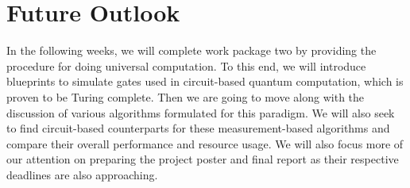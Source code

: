 \section{Future Outlook}

In the following weeks, we will complete work package two by providing the procedure for doing universal computation. To this end, we will introduce blueprints to simulate gates used in circuit-based quantum computation, which is proven to be Turing complete. Then we are going to move along with the discussion of various algorithms formulated for this paradigm. We will also seek to find circuit-based counterparts for these measurement-based algorithms and compare their overall performance and resource usage. We will also focus more of our attention on preparing the project poster and final report as their respective deadlines are also approaching.